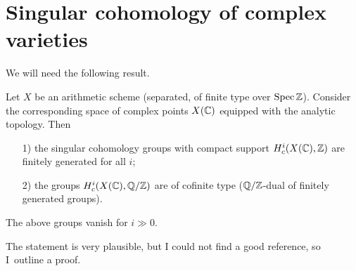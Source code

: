 \section{Singular cohomology of complex varieties}
\label{section:singular-cohomology-of-complex-varieties}

We will need the following result.

\begin{proposition}
  \label{thm:singular-cohomology-of-complex-varieties}
  Let $X$ be an arithmetic scheme (separated, of finite type over
  $\operatorname{Spec}\mathbb{Z}$). Consider the corresponding space of complex points $X (\mathbb{C})$
  equipped with the analytic topology. Then

  \begin{enumerate}
  \item[1)] the singular cohomology groups with compact support
    $H_c^i (X (\mathbb{C}), \mathbb{Z})$ are finitely generated for all $i$;

  \item[2)] the groups $H_c^i (X (\mathbb{C}), \mathbb{Q}/\mathbb{Z})$ are of cofinite type
    ($\mathbb{Q}/\mathbb{Z}$-dual of finitely generated groups).
  \end{enumerate}

  The above groups vanish for $i \gg 0$.
\end{proposition}

\noindent The statement is very plausible, but I could not find a good
reference, so I~outline a proof.

